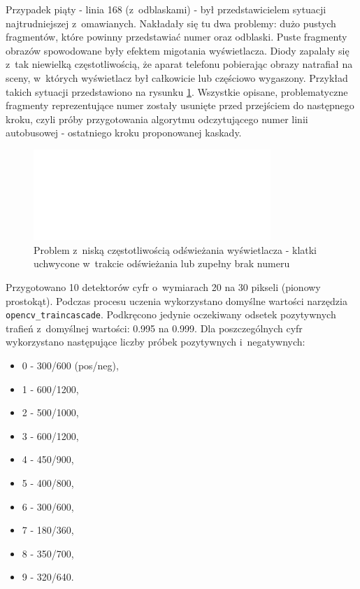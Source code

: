 Przypadek piąty - linia 168 (z~odblaskami) - był przedstawicielem sytuacji
najtrudniejszej z~omawianych. Nakładały się tu dwa problemy: dużo pustych
fragmentów, które powinny przedstawiać numer oraz odblaski.
Puste fragmenty obrazów spowodowane były efektem migotania wyświetlacza.
Diody zapalały się z~tak niewielką częstotliwością, że aparat telefonu
pobierając obrazy natrafiał na sceny, w~których wyświetlacz był całkowicie
lub częściowo wygaszony. Przykład takich sytuacji przedstawiono na rysunku
\ref{fig:5usecasesFlickeringProblem}. Wszystkie opisane, problematyczne 
fragmenty reprezentujące numer zostały usunięte przed przejściem do następnego kroku,
czyli próby przygotowania algorytmu odczytującego numer linii autobusowej - ostatniego
kroku proponowanej kaskady.

\begin{figure}[!h]
	\centering
	\includegraphics[width=0.8\textwidth]{img/5sessions/flickering168/out}
	\caption{Problem z~niską częstotliwością odświeżania wyświetlacza - klatki
		uchwycone w~trakcie odświeżania lub zupełny brak numeru}
	\label{fig:5usecasesFlickeringProblem}
\end{figure}

Przygotowano 10 detektorów cyfr o~wymiarach 20 na 30 pikseli (pionowy prostokąt).
Podczas procesu uczenia wykorzystano domyślne wartości narzędzia 
\verb|opencv_traincascade|. 
Podkręcono jedynie oczekiwany odsetek pozytywnych trafień z~domyślnej wartości:
0.995 na 0.999. Dla poszczególnych cyfr wykorzystano następujące liczby 
próbek pozytywnych i~negatywnych:
\begin{itemize}
	\item 0 - 300/600 (pos/neg),
	\item 1 - 600/1200,
	\item 2 - 500/1000,
	\item 3 - 600/1200,
	\item 4 - 450/900,
	\item 5 - 400/800,
	\item 6 - 300/600,
	\item 7 - 180/360,
	\item 8 - 350/700,
	\item 9 - 320/640.
\end{itemize}

